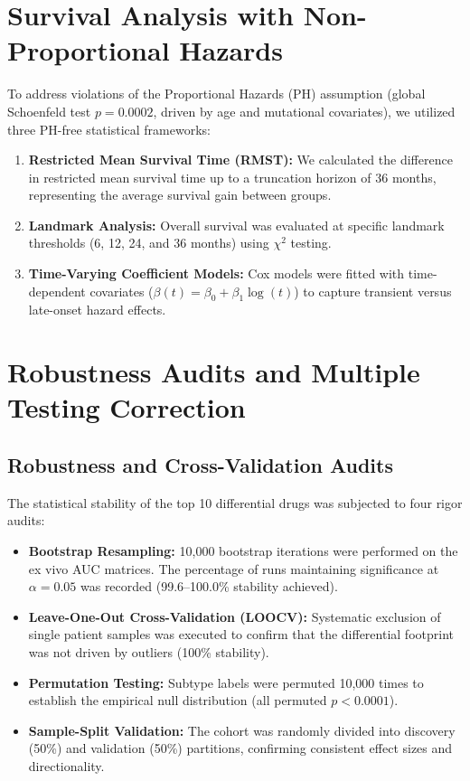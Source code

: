 \documentclass[11pt,a4paper]{article}
\begin{document}
\section{Survival Analysis with Non-Proportional Hazards}
To address violations of the Proportional Hazards (PH) assumption (global Schoenfeld test $p = 0.0002$, driven by age and mutational covariates), we utilized three PH-free statistical frameworks:
\begin{enumerate}
    \item \textbf{Restricted Mean Survival Time (RMST):} We calculated the difference in restricted mean survival time up to a truncation horizon of 36 months, representing the average survival gain between groups.
    \item \textbf{Landmark Analysis:} Overall survival was evaluated at specific landmark thresholds (6, 12, 24, and 36 months) using $\chi^2$ testing.
    \item \textbf{Time-Varying Coefficient Models:} Cox models were fitted with time-dependent covariates ($\beta(t) = \beta_0 + \beta_1 \log(t)$) to capture transient versus late-onset hazard effects.
\end{enumerate}

\section{Robustness Audits and Multiple Testing Correction}

\subsection{Robustness and Cross-Validation Audits}
The statistical stability of the top 10 differential drugs was subjected to four rigor audits:
\begin{itemize}
    \item \textbf{Bootstrap Resampling:} 10,000 bootstrap iterations were performed on the ex vivo AUC matrices. The percentage of runs maintaining significance at $\alpha = 0.05$ was recorded (99.6--100.0\% stability achieved).
    \item \textbf{Leave-One-Out Cross-Validation (LOOCV):} Systematic exclusion of single patient samples was executed to confirm that the differential footprint was not driven by outliers (100\% stability).
    \item \textbf{Permutation Testing:} Subtype labels were permuted 10,000 times to establish the empirical null distribution (all permuted $p < 0.0001$).
    \item \textbf{Sample-Split Validation:} The cohort was randomly divided into discovery (50\%) and validation (50\%) partitions, confirming consistent effect sizes and directionality.
\end{itemize}
\end{document}
